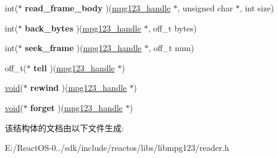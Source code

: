 \begin{DoxyCompactItemize}
int($\ast$ {\bfseries read\+\_\+frame\+\_\+body} )(\hyperlink{group__mpg123__init_ga6728e2839a395f3a07d4514da659faca}{mpg123\+\_\+handle} $\ast$, unsigned char $\ast$, int size)
\item 
\mbox{\label{structreader_ac9f560613417fb3c405f767bf505aa01}} 
int($\ast$ {\bfseries back\+\_\+bytes} )(\hyperlink{group__mpg123__init_ga6728e2839a395f3a07d4514da659faca}{mpg123\+\_\+handle} $\ast$, off\+\_\+t bytes)
\item 
\mbox{\label{structreader_a4e88bc484b5fdc152812f814a609ad97}} 
int($\ast$ {\bfseries seek\+\_\+frame} )(\hyperlink{group__mpg123__init_ga6728e2839a395f3a07d4514da659faca}{mpg123\+\_\+handle} $\ast$, off\+\_\+t num)
\item 
\mbox{\label{structreader_afb491ebac78322a54f17c90448a12543}} 
off\+\_\+t($\ast$ {\bfseries tell} )(\hyperlink{group__mpg123__init_ga6728e2839a395f3a07d4514da659faca}{mpg123\+\_\+handle} $\ast$)
\item 
\mbox{\label{structreader_ab48dfb6197bf2ae117c3770ff1aaa7c0}} 
\hyperlink{interfacevoid}{void}($\ast$ {\bfseries rewind} )(\hyperlink{group__mpg123__init_ga6728e2839a395f3a07d4514da659faca}{mpg123\+\_\+handle} $\ast$)
\item 
\mbox{\label{structreader_ac83c93d051b7e1821bad18b102b91e23}} 
\hyperlink{interfacevoid}{void}($\ast$ {\bfseries forget} )(\hyperlink{group__mpg123__init_ga6728e2839a395f3a07d4514da659faca}{mpg123\+\_\+handle} $\ast$)
\end{DoxyCompactItemize}


该结构体的文档由以下文件生成\+:\begin{DoxyCompactItemize}
\item 
E\+:/\+React\+O\+S-\/0../sdk/include/reactos/libs/libmpg123/reader.\+h\end{DoxyCompactItemize}
